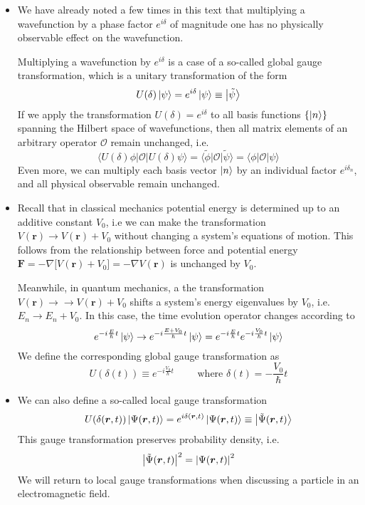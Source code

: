 \documentclass[11pt, a4paper]{article}
\renewcommand{\grad}{\nabla}
\renewcommand{\vec}[1]{\bm{#1}}  %
\renewcommand{\t}[1]{\tilde{#1}}
\renewcommand{\r}{\vec{r}}  %
\renewcommand{\O}{\mathcal{O}}  %
\newcommand{\p}{\psi}  %
\renewcommand{\P}{\Psi}  %
\newcommand{\bket}[1]{\big | {#1} \big \rangle }
\newcommand{\bmel}[3]{\big \langle {#1} \big | {#2} \big | {#3} \big \rangle}  %
\renewcommand{\k}[1]{\ket{#1}}
\begin{document}
\begin{itemize}
	\item We have already noted a few times in this text that multiplying a wavefunction by a phase factor $ e^{i\delta} $ of magnitude one has no physically observable effect on the wavefunction. 
	
	Multiplying a wavefunction by $ e^{i\delta} $ is a case of a so-called global gauge transformation, which is a unitary transformation of the form
	\begin{equation*}
		U(\delta)\ket{\psi} = e^{i\delta}\ket{\p} \equiv \bket{\tilde{\p}}
	\end{equation*}
	If we apply the transformation $ U(\delta) = e^{i\delta} $ to all basis functions $ \{\ket{n}\} $ spanning the Hilbert space of wavefunctions, then all matrix elements of an arbitrary operator $ \O $ remain unchanged, i.e. 
	\begin{equation*}
		\bmel{U(\delta) \phi}{\O}{U(\delta)\p} = \bmel{\t{\phi}}{\O}{\t{\p}} = \bmel{\phi}{\O}{\p} 
	\end{equation*}
	Even more, we can multiply each basis vector $ \ket{n} $ by an individual factor $ e^{i \delta_{n}} $, and all physical observable remain unchanged.
	
	\item Recall that in classical mechanics potential energy is determined up to an additive constant $ V_{0} $, i.e we can make the transformation $ V(\r) \to V(\r) + V_{0} $ without changing a system's equations of motion. This follows from the relationship between force and potential energy $ \vec{F} = - \grad\big[V(\r) + V_{0}\big] = - \grad V(\r) $ is unchanged by $ V_{0} $.
	
	Meanwhile, in quantum mechanics, a the transformation $ V(\r) \to \to V(\r) + V_{0} $ shifts a system's energy eigenvalues by $ V_{0} $, i.e. $ E_{n} \to E_{n} + V_{0} $. In this case, the time evolution operator changes according to
	\begin{equation*}
		e^{-i\frac{E}{\hbar}t}\k{\p} \to e^{-i\frac{E+V_{0}}{\hbar}t}\k{\p} = e^{-i\frac{E}{\hbar}t} e^{-i\frac{V_{0}}{\hbar}t}  \k{\p} 
	\end{equation*}
	We define the corresponding global gauge transformation as
	\begin{equation*}
		U(\delta(t)) \equiv e^{-i\frac{V_{0}}{\hbar}t} \qquad \text{ where } \delta(t) = -\frac{V_{0}}{\hbar}t
	\end{equation*}
	
	\item We can also define a so-called local gauge transformation
	\begin{equation*}
		U(\delta(\r, t)) \ket{\P(\r, t)} = e^{i\delta(\r, t)}\ket{\P(\r, t)} \equiv \bket{\t{\P}(\r, t)}
	\end{equation*}
	This gauge transformation preserves probability density, i.e.
	\begin{equation*}
		\big|\t{\P}(\r, t) \big|^{2} = \abs{\P(\r, t)}^{2}
	\end{equation*}
	We will return to local gauge transformations when discussing a particle in an electromagnetic field. 
\end{itemize}
\end{document}
